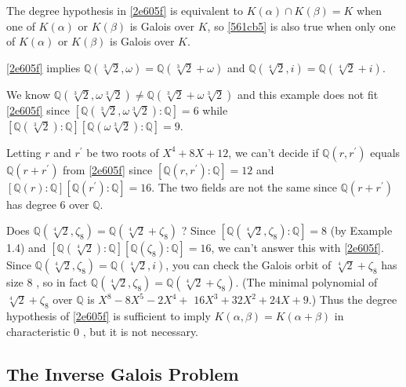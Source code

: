 \begin{remark}
The degree hypothesis in \cref{2e605f} is equivalent to $K(\alpha)\cap K(\beta)=K$ when one of $K(\alpha)$ or $K(\beta)$ is Galois over $K$, so \cref{561cb5} is also true when only one of $K(\alpha)$ or $K(\beta)$ is Galois over $K$.
\end{remark}
\begin{example}
\cref{2e605f} implies $\mathbb{Q}(\sqrt[3]{2}, \omega)=\mathbb{Q}(\sqrt[3]{2}+\omega)$ and $\mathbb{Q}(\sqrt[4]{2}, i)=\mathbb{Q}(\sqrt[4]{2}+i)$.
\end{example}
\begin{example}
We know $\mathbb{Q}(\sqrt[3]{2}, \omega \sqrt[3]{2}) \neq \mathbb{Q}(\sqrt[3]{2}+\omega \sqrt[3]{2})$ and this example does not fit  \cref{2e605f} since $[\mathbb{Q}(\sqrt[3]{2}, \omega \sqrt[3]{2}): \mathbb{Q}]=6$ while $[\mathbb{Q}(\sqrt[3]{2}): \mathbb{Q}][\mathbb{Q}(\omega \sqrt[3]{2}): \mathbb{Q}]=9$.
\end{example}
\begin{example}
Letting $r$ and $r^{\prime}$ be two roots of $X^4+8 X+12$, we can't decide if $\mathbb{Q}\left(r, r^{\prime}\right)$ equals $\mathbb{Q}\left(r+r^{\prime}\right)$ from  \cref{2e605f} since $\left[\mathbb{Q}\left(r, r^{\prime}\right): \mathbb{Q}\right]=12$ and $[\mathbb{Q}(r): \mathbb{Q}]\left[\mathbb{Q}\left(r^{\prime}\right): \mathbb{Q}\right]=16$. The two fields are not the same since $\mathbb{Q}\left(r+r^{\prime}\right)$ has degree 6 over $\mathbb{Q}$.
\end{example}
\begin{example}
Does $\mathbb{Q}\left(\sqrt[4]{2}, \zeta_8\right)=\mathbb{Q}\left(\sqrt[4]{2}+\zeta_8\right)$ ? Since $\left[\mathbb{Q}\left(\sqrt[4]{2}, \zeta_8\right): \mathbb{Q}\right]=8$ (by Example 1.4) and $[\mathbb{Q}(\sqrt[4]{2}): \mathbb{Q}]\left[\mathbb{Q}\left(\zeta_8\right): \mathbb{Q}\right]=16$, we can't answer this with  \cref{2e605f}. Since $\mathbb{Q}\left(\sqrt[4]{2}, \zeta_8\right)=\mathbb{Q}(\sqrt[4]{2}, i)$, you can check the Galois orbit of $\sqrt[4]{2}+\zeta_8$ has size 8 , so in fact $\mathbb{Q}\left(\sqrt[4]{2}, \zeta_8\right)=\mathbb{Q}\left(\sqrt[4]{2}+\zeta_8\right)$. (The minimal polynomial of $\sqrt[4]{2}+\zeta_8$ over $\mathbb{Q}$ is $X^8-8 X^5-2 X^4+$ $16 X^3+32 X^2+24 X+9$.) Thus the degree hypothesis of  \cref{2e605f} is sufficient to imply $K(\alpha, \beta)=K(\alpha+\beta)$ in characteristic 0 , but it is not necessary.
\end{example}
\subsection{The Inverse Galois Problem}

